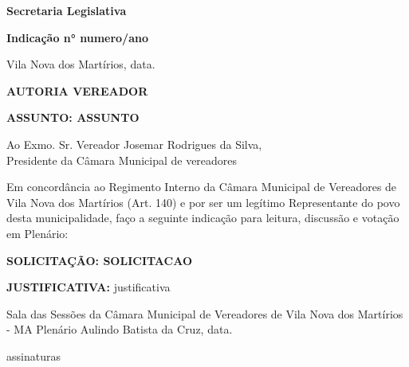 \documentclass[12pt]{letter} %
\begin{document}
\begin{flushright} %
\textbf{ Secretaria Legislativa } \\ %

\begin{flushleft} %
\textbf{Indicação n° {{numero}}/{{ano}}} %
\end{flushleft}
\vspace{0.6cm} %
Vila Nova dos Martírios, {{data}}. %
\end{flushright}

\vspace{0.6cm}
\begin{flushleft} %
\textbf{AUTORIA \MakeUppercase{ {{vereador}} }}
\end{flushleft}
\vspace{0.3cm}

\begin{justify}
\textbf{ASSUNTO: \MakeUppercase{ {{assunto}} }}
\end{justify}
\vspace{0.3cm}

\begin{justify}
	Ao Exmo. Sr. Vereador Josemar Rodrigues da Silva, \\
	Presidente da Câmara Municipal de vereadores \\
\end{justify}

\begin{justify}
	Em concordância ao Regimento Interno da Câmara Municipal de Vereadores de Vila Nova dos Martírios (Art. 140) e por ser um legítimo Representante do povo desta municipalidade, faço a seguinte indicação para leitura, discussão e votação em Plenário:
\end{justify}

\vspace{0.3cm}
\begin{justify}
	\MakeUppercase{\textbf{SOLICITAÇÃO: {{solicitacao}} }}
\end{justify}

\vspace{0.3cm}
\begin{justify}
	\textbf{JUSTIFICATIVA:} {{justificativa}} 
\end{justify}

\vspace{0.3cm}
\begin{justify}
		Sala das Sessões da Câmara Municipal de Vereadores de Vila Nova dos Martírios - MA Plenário Aulindo Batista da Cruz, {{data}}.
\end{justify}

\vspace{1.3cm}

\begin{center}
{{assinaturas}}
\end{center}
\end{document}
